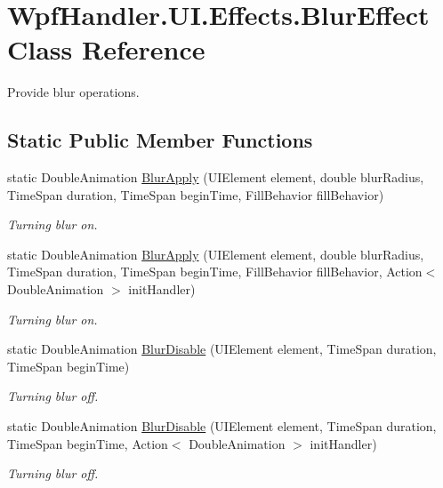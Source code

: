 \hypertarget{class_wpf_handler_1_1_u_i_1_1_effects_1_1_blur_effect}{}\section{Wpf\+Handler.\+U\+I.\+Effects.\+Blur\+Effect Class Reference}
\label{class_wpf_handler_1_1_u_i_1_1_effects_1_1_blur_effect}


Provide blur operations.  


\subsection*{Static Public Member Functions}
\begin{DoxyCompactItemize}
\item 
static Double\+Animation \mbox{\hyperlink{class_wpf_handler_1_1_u_i_1_1_effects_1_1_blur_effect_a4f7eaa622e8bc4226f865a7f9afa5d07}{Blur\+Apply}} (U\+I\+Element element, double blur\+Radius, Time\+Span duration, Time\+Span begin\+Time, Fill\+Behavior fill\+Behavior)
\begin{DoxyCompactList}\small\item\em Turning blur on. \end{DoxyCompactList}\item 
static Double\+Animation \mbox{\hyperlink{class_wpf_handler_1_1_u_i_1_1_effects_1_1_blur_effect_ac4161005a77de53909ed18c82477491a}{Blur\+Apply}} (U\+I\+Element element, double blur\+Radius, Time\+Span duration, Time\+Span begin\+Time, Fill\+Behavior fill\+Behavior, Action$<$ Double\+Animation $>$ init\+Handler)
\begin{DoxyCompactList}\small\item\em Turning blur on. \end{DoxyCompactList}\item 
static Double\+Animation \mbox{\hyperlink{class_wpf_handler_1_1_u_i_1_1_effects_1_1_blur_effect_a1d0e1aab31423c3bac492e41c51554b5}{Blur\+Disable}} (U\+I\+Element element, Time\+Span duration, Time\+Span begin\+Time)
\begin{DoxyCompactList}\small\item\em Turning blur off. \end{DoxyCompactList}\item 
static Double\+Animation \mbox{\hyperlink{class_wpf_handler_1_1_u_i_1_1_effects_1_1_blur_effect_a894c9100c3d72af41a15ab60ac4a62c1}{Blur\+Disable}} (U\+I\+Element element, Time\+Span duration, Time\+Span begin\+Time, Action$<$ Double\+Animation $>$ init\+Handler)
\begin{DoxyCompactList}\small\item\em Turning blur off. \end{DoxyCompactList}\end{DoxyCompactItemize}


